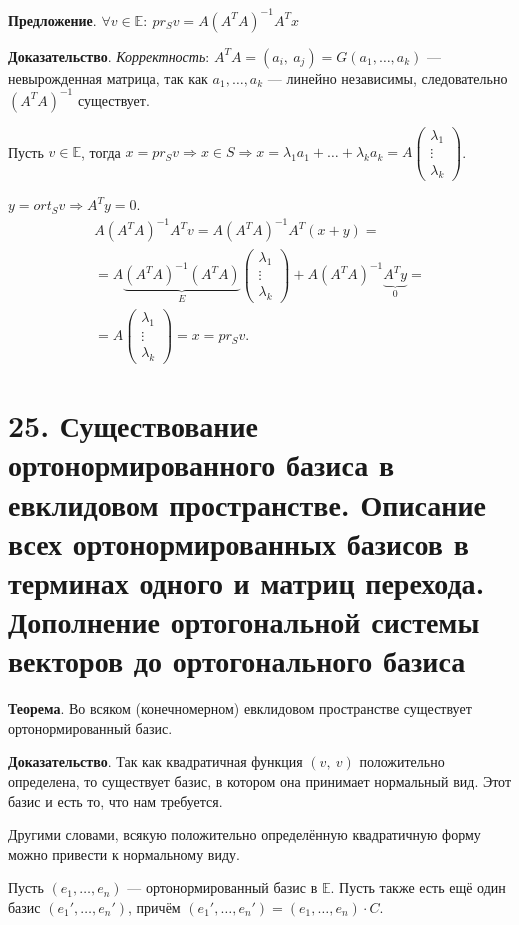 \documentclass[a4paper, 12pt]{article}
\newcommand{\E}{\mathbb{E}}
\begin{document}
\textbf{Предложение}. $\forall v \in \E:\ pr_Sv = A(A^TA)^{-1}A^Tx$

\textbf{Доказательство}. \textit{Корректность}: $A^TA = (a_i,\ a_j) = G(a_1, \ldots, a_k)$ --- невырожденная матрица, так как $a_1, \ldots, a_k$ --- линейно независимы, следовательно $(A^TA)^{-1}$ существует.

Пусть $v \in \E$, тогда $x = pr_Sv \Rightarrow x \in S \Rightarrow x = \lambda_1a_1 + \ldots + \lambda_ka_k = A\begin{pmatrix}\lambda_1 \\ \vdots \\ \lambda_k \end{pmatrix}$.

$y = ort_Sv \Rightarrow A^Ty = 0$.
\vspace{-3mm}
\begin{gather*}
A(A^TA)^{-1}A^Tv = A(A^TA)^{-1}A^T(x + y) = \\ = A\underbrace{(A^TA)^{-1}(A^TA)}_{E}\begin{pmatrix}\lambda_1 \\ \vdots \\ \lambda_k \end{pmatrix} + A(A^TA)^{-1}\underbrace{A^Ty}_{0} = \\ = A\begin{pmatrix}\lambda_1 \\ \vdots \\ \lambda_k \end{pmatrix} = x = pr_Sv.
\end{gather*}

\section*{25. Существование ортонормированного базиса в евклидовом пространстве. Описание всех ортонормированных базисов в терминах одного и матриц перехода. Дополнение ортогональной системы векторов до ортогонального базиса}
\textbf{Теорема}. Во всяком (конечномерном) евклидовом пространстве существует ортонормированный базис.

\textbf{Доказательство}. Так как квадратичная функция $(v,\ v)$ положительно определена, то существует базис, в котором она принимает нормальный вид. Этот базис и есть то, что нам требуется.

Другими словами, всякую положительно определённую квадратичную форму можно привести к нормальному виду.

\vspace{5mm}
Пусть $(e_1, \ldots, e_n)$ --- ортонормированный базис в $\E$. Пусть также есть ещё один базис $(e_1', \ldots, e_n')$, причём $(e_1', \ldots, e_n') = (e_1, \ldots, e_n) \cdot C$.
\end{document}
